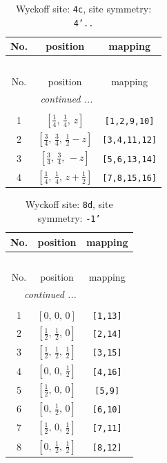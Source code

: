 \documentclass[fleqn,8pt]{jsarticle}
\begin{document}
\renewcommand{\arraystretch}{1.2}
\begin{longtable}{ccc}
\caption{Wyckoff site: {\tt 4c}, site symmetry: {\tt 4'..}}
 \\
 \hline \hline
No. & position & mapping \\ \hline \endfirsthead

\multicolumn{2}{l}{\tablename\ \thetable{}} \\
 \hline \hline
No. & position & mapping \\ \hline \endhead

 \hline \hline
\multicolumn{2}{r}{\footnotesize\it continued ...} \\ \endfoot

 \hline \hline
\multicolumn{2}{r}{} \\ \endlastfoot

1 & $\left[ \frac{1}{4},\, \frac{1}{4},\, z \right]$ & {\tt [1,2,9,10]} \\ \hline
2 & $\left[ \frac{3}{4},\, \frac{3}{4},\, \frac{1}{2} - z \right]$ & {\tt [3,4,11,12]} \\ \hline
3 & $\left[ \frac{3}{4},\, \frac{3}{4},\, - z \right]$ & {\tt [5,6,13,14]} \\ \hline
4 & $\left[ \frac{1}{4},\, \frac{1}{4},\, z + \frac{1}{2} \right]$ & {\tt [7,8,15,16]} \\
\end{longtable}
\renewcommand{\arraystretch}{1.2}
\begin{longtable}{ccc}
\caption{Wyckoff site: {\tt 8d}, site symmetry: {\tt -1'}}
 \\
 \hline \hline
No. & position & mapping \\ \hline \endfirsthead

\multicolumn{2}{l}{\tablename\ \thetable{}} \\
 \hline \hline
No. & position & mapping \\ \hline \endhead

 \hline \hline
\multicolumn{2}{r}{\footnotesize\it continued ...} \\ \endfoot

 \hline \hline
\multicolumn{2}{r}{} \\ \endlastfoot

1 & $\left[ 0,\, 0,\, 0 \right]$ & {\tt [1,13]} \\ \hline
2 & $\left[ \frac{1}{2},\, \frac{1}{2},\, 0 \right]$ & {\tt [2,14]} \\ \hline
3 & $\left[ \frac{1}{2},\, \frac{1}{2},\, \frac{1}{2} \right]$ & {\tt [3,15]} \\ \hline
4 & $\left[ 0,\, 0,\, \frac{1}{2} \right]$ & {\tt [4,16]} \\ \hline
5 & $\left[ \frac{1}{2},\, 0,\, 0 \right]$ & {\tt [5,9]} \\ \hline
6 & $\left[ 0,\, \frac{1}{2},\, 0 \right]$ & {\tt [6,10]} \\ \hline
7 & $\left[ \frac{1}{2},\, 0,\, \frac{1}{2} \right]$ & {\tt [7,11]} \\ \hline
8 & $\left[ 0,\, \frac{1}{2},\, \frac{1}{2} \right]$ & {\tt [8,12]} \\
\end{longtable}
\end{document}
